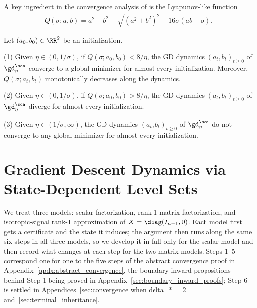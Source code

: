 \documentclass{article}
\begin{document}
A key ingredient in the convergence analysis of \cite{liang2025gradient} is the Lyapunov-like function
\begin{align}
    Q(\sigma; a,b) = a^2 + b^2 + \sqrt{(a^2 + b^2)^2 - 16 \sigma(ab-\sigma)}.
\end{align}
\begin{theorem}\label{thm:convergence_region}
Let $(a_0,b_0)\in \RR^2$ be an initialization.

(1) Given $\eta \in (0,1/\sigma)$, if $Q(\sigma;a_0,b_0) < 8/\eta$, the GD dynamics $(a_t,b_t)_{t\ge0}$ of $\gd_\eta^\sca$ converge to a global minimizer for almost every initialization. Moreover, $Q(\sigma; a_t,b_t)$ monotonically decreases along the dynamics.

(2) Given $\eta \in (0,1/\sigma)$, if $Q(\sigma;a_0,b_0) > 8/\eta$, the GD dynamics $(a_t,b_t)_{t\ge0}$ of $\gd_\eta^\sca$ diverge for almost every initialization.

(3) Given $\eta \in (1/\sigma, \infty)$, the GD dynamics $(a_t,b_t)_{t\ge0}$ of $\gd_\eta^\sca$ do not converge to any global minimizer for almost every initialization.
\end{theorem}

%

\section{Gradient Descent Dynamics via State-Dependent Level Sets}\label{sec:rank-1 convergence}

We treat three models: scalar factorization, rank-1 matrix factorization, and
isotropic-signal rank-1 approximation of $X=\diag(I_{n-1},0)$. Each model first
gets a certificate and the state it induces; the argument then runs along the
same six steps in all three models, so we develop it in full only for the scalar
model and then record what changes at each step for the two matrix models.
Steps 1--5 correspond one for one to the five steps of the abstract convergence
proof in Appendix~\ref{apdx:abstract_convergence}, the boundary-inward
propositions behind Step 1 being proved in
Appendix~\ref{sec:boundary_inward_proofs}; Step 6 is settled in
Appendices~\ref{sec:convergence when delta_* = 2}
and~\ref{sec:terminal_inheritance}.
\end{document}
